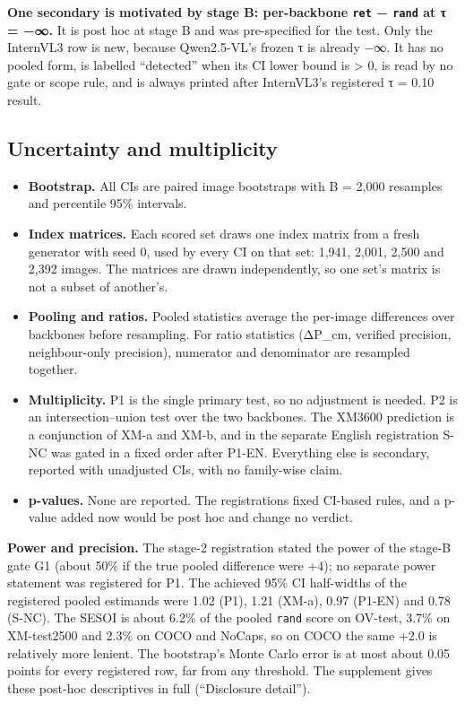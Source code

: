 \documentclass[manuscript,screen]{acmart}
\providecommand{\tightlist}{\setlength{\itemsep}{0pt}\setlength{\parskip}{0pt}}
\begin{document}
\textbf{One secondary is motivated by stage B: per-backbone \texttt{ret} − \texttt{rand} at τ = −∞.}
It is post hoc at stage B and was pre-specified for the test. Only the InternVL3 row is new, because
Qwen2.5-VL's frozen τ is already −∞. It has no pooled form, is labelled ``detected'' when its CI
lower bound is \textgreater{} 0, is read by no gate or scope rule, and is always printed after
InternVL3's registered τ = 0.10 result.

\subsection{Uncertainty and multiplicity}\label{uncertainty-and-multiplicity}

\begin{itemize}
\tightlist
\item
  \textbf{Bootstrap.} All CIs are paired image bootstraps with B = 2,000 resamples and percentile
  95\% intervals.
\item
  \textbf{Index matrices.} Each scored set draws one index matrix from a fresh generator with seed
  0, used by every CI on that set: 1,941, 2,001, 2,500 and 2,392 images. The matrices are drawn
  independently, so one set's matrix is not a subset of another's.
\item
  \textbf{Pooling and ratios.} Pooled statistics average the per-image differences over backbones
  before resampling. For ratio statistics (ΔP\_cm, verified precision, neighbour-only precision),
  numerator and denominator are resampled together.
\item
  \textbf{Multiplicity.} P1 is the single primary test, so no adjustment is needed. P2 is an
  intersection--union test over the two backbones. The XM3600 prediction is a conjunction of XM-a
  and XM-b, and in the separate English registration S-NC was gated in a fixed order after P1-EN.
  Everything else is secondary, reported with unadjusted CIs, with no family-wise claim.
\item
  \textbf{p-values.} None are reported. The registrations fixed CI-based rules, and a p-value added
  now would be post hoc and change no verdict.
\end{itemize}

\textbf{Power and precision.} The stage-2 registration stated the power of the stage-B gate G1
(about 50\% if the true pooled difference were +4); no separate power statement was registered for
P1. The achieved 95\% CI half-widths of the registered pooled estimands were 1.02 (P1), 1.21 (XM-a),
0.97 (P1-EN) and 0.78 (S-NC). The SESOI is about 6.2\% of the pooled \texttt{rand} score on OV-test,
3.7\% on XM-test2500 and 2.3\% on COCO and NoCaps, so on COCO the same +2.0 is relatively more
lenient. The bootstrap's Monte Carlo error is at most about 0.05 points for every registered row,
far from any threshold. The supplement gives these post-hoc descriptives in full (``Disclosure
detail'').
\end{document}
